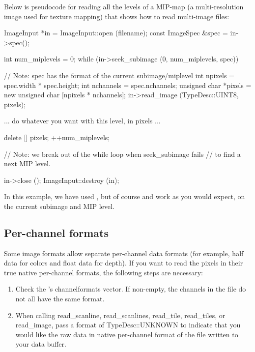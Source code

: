 Below is pseudocode for reading all the levels of a MIP-map (a
multi-resolution image used for texture mapping) that shows how to read
multi-image files:

\begin{code}
        ImageInput *in = ImageInput::open (filename);
        const ImageSpec &spec = in->spec();

        int num_miplevels = 0;
        while (in->seek_subimage (0, num_miplevels, spec)) {
            // Note: spec has the format of the current subimage/miplevel
            int npixels = spec.width * spec.height;
            int nchannels = spec.nchannels;
            unsigned char *pixels = new unsigned char [npixels * nchannels];
            in->read_image (TypeDesc::UINT8, pixels);

            ... do whatever you want with this level, in pixels ...

            delete [] pixels;
            ++num_miplevels;
        }
        // Note: we break out of the while loop when seek_subimage fails
        // to find a next MIP level.

        in->close ();
        ImageInput::destroy (in);
\end{code}

In this example, we have used \readimage, but of course \readscanline
and \readtile work as you would expect, on the current subimage and MIP
level.


\subsection{Per-channel formats}
\label{sec:imageinput:channelformats}

Some image formats allow separate per-channel data formats (for example,
{\cf half} data for colors and {\cf float} data for depth).  If you want
to read the pixels in their true native per-channel formats,
the following steps are necessary:

\begin{enumerate}
\item Check the \ImageSpec's {\cf channelformats} vector.  If non-empty,
  the channels in the file do not all have the same format.
\item When calling {\cf read_scanline}, {\cf read_scanlines},
  {\cf read_tile}, {\cf read_tiles}, or {\cf read_image}, 
  pass a format of {\cf TypeDesc::UNKNOWN} to indicate that
  you would like the raw data in native per-channel format of the file
  written to your {\cf data} buffer.
\end{enumerate}

